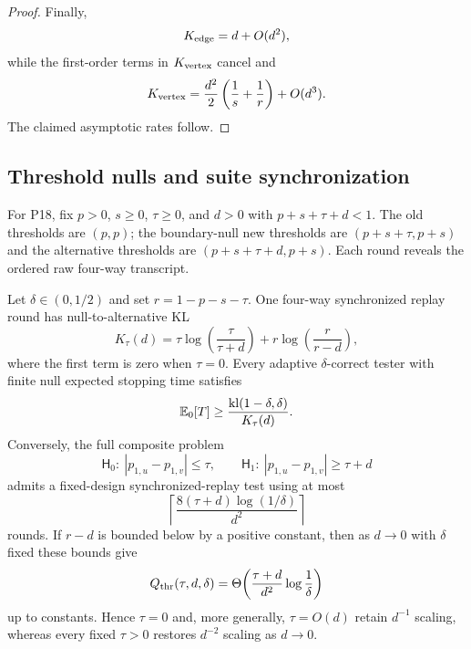 \begin{proof}
Finally,
\begin{equation}\label{eq:formal-results-031}
K_{\rm edge}
=
d+O(d^2),
\end{equation}
while the first-order terms in \(K_{\rm vertex}\) cancel and
\begin{equation}\label{eq:formal-results-032}
K_{\rm vertex}
=
\frac{d^2}{2}
\left(
\frac{1}{s}+\frac{1}{r}
\right)
+
O(d^3).
\end{equation}
The claimed asymptotic rates follow.
\end{proof}


\subsection{Threshold nulls and suite synchronization}

For P18, fix $p>0$, $s\ge0$, $\tau\ge0$, and $d>0$ with
$p+s+\tau+d<1$.  The old thresholds are $(p,p)$; the boundary-null new
thresholds are $(p+s+\tau,p+s)$ and the alternative thresholds are
$(p+s+\tau+d,p+s)$.  Each round reveals the ordered raw four-way transcript.


\begin{theorem}
\label{thm:threshold-replay-phase}
Let $\delta\in(0,1/2)$ and set $r=1-p-s-\tau$.  One four-way synchronized
replay round has null-to-alternative KL
\begin{equation}\label{eq:formal-results-033}
K_\tau(d)
=
\tau\log\!\left(\frac{\tau}{\tau+d}\right)
+
r\log\!\left(\frac{r}{r-d}\right),
\end{equation}
where the first term is zero when $\tau=0$.  Every adaptive
$\delta$-correct tester with finite null expected stopping time satisfies
\begin{equation}\label{eq:formal-results-034}
\mathbb{E}_0[T]\ge
\frac{\mathrm{kl}(1-\delta,\delta)}{K_\tau(d)}.
\end{equation}
Conversely, the full composite problem
\begin{equation}\label{eq:formal-results-035}
\mathsf H_0:\ |p_{1,u}-p_{1,v}|\le\tau,
\qquad
\mathsf H_1:\ |p_{1,u}-p_{1,v}|\ge\tau+d
\end{equation}
admits a fixed-design synchronized-replay test using at most
\begin{equation}\label{eq:formal-results-036}
\left\lceil
\frac{8(\tau+d)\log(1/\delta)}{d^2}
\right\rceil
\end{equation}
rounds.  If $r-d$ is bounded below by a positive constant, then as $d\to0$
with $\delta$ fixed these bounds give
\begin{equation}\label{eq:formal-results-037}
Q_{\rm thr}(\tau,d,\delta)
=
\Theta\!\left(
\frac{\tau+d}{d^2}\log\frac1\delta
\right)
\end{equation}
up to constants.  Hence $\tau=0$ and, more generally, $\tau=O(d)$ retain
$d^{-1}$ scaling, whereas every fixed $\tau>0$ restores $d^{-2}$ scaling as
$d\to0$.
\end{theorem}

